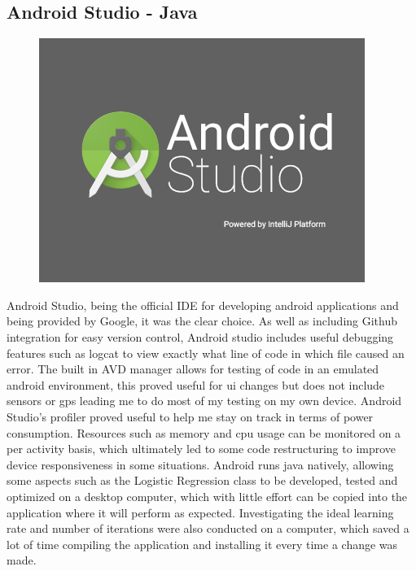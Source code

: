 \subsection{Android Studio - Java}

\begin{figure}
\begin{center}
\includegraphics[scale = 0.3] {implementation/studio-logo.png}
\end{center}

\label{studio}
\end{figure}

Android Studio, being the official IDE for developing android applications and being provided by Google, it was the clear choice. As well as including Github integration for easy version control, Android studio includes useful debugging features such as logcat to view exactly what line of code in which file caused an error. The built in AVD manager allows for testing of code in an emulated android environment, this proved useful for ui changes but does not include sensors or gps leading me to do most of my testing on my own device. Android Studio’s profiler proved useful to help me stay on track in terms of power consumption. Resources such as memory and cpu usage can be monitored on a per activity basis, which ultimately led to some code restructuring to improve device responsiveness in some situations. Android runs java natively, allowing some aspects such as the Logistic Regression class to be developed, tested and optimized on a desktop computer, which with little effort can be copied into the application where it will perform as expected. Investigating the ideal learning rate and number of iterations were also conducted on a computer, which saved a lot of time compiling the application and installing it every time a change was made.   



